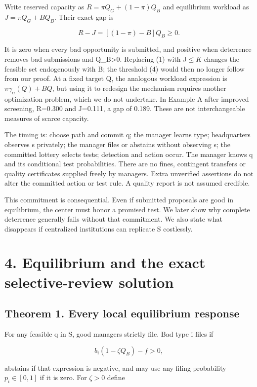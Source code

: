 \documentclass[
  11pt,
]{article}
\begin{document}
Write reserved capacity as \(R=\pi Q_G+(1-\pi)Q_B\) and equilibrium
workload as \(J=\pi Q_G+BQ_B\). Their exact gap is

\[R-J=[(1-\pi)-B]Q_B\geq0.\]

It is zero when every bad opportunity is submitted, and positive when
deterrence removes bad submissions and Q\_B\textgreater0. Replacing (1)
with J\(\leq K\) changes the feasible set endogenously with B; the
threshold (4) would then no longer follow from our proof. At a fixed
target Q, the analogous workload expression is
\(\pi\gamma_\alpha(Q)+BQ\), but using it to redesign the mechanism
requires another optimization problem, which we do not undertake. In
Example A after improved screening, R=0.300 and J=0.111, a gap of 0.189.
These are not interchangeable measures of scarce capacity.

The timing is: choose path and commit q; the manager learns type;
headquarters observes s privately; the manager files or abstains without
observing s; the committed lottery selects tests; detection and action
occur. The manager knows q and its conditional test probabilities. There
are no fines, contingent transfers or quality certificates supplied
freely by managers. Extra unverified assertions do not alter the
committed action or test rule. A quality report is not assumed credible.

This commitment is consequential. Even if submitted proposals are good
in equilibrium, the center must honor a promised test. We later show why
complete deterrence generally fails without that commitment. We also
state what disappears if centralized institutions can replicate S
costlessly.

\section{4. Equilibrium and the exact selective-review
solution}\label{equilibrium-and-the-exact-selective-review-solution}

\subsection{Theorem 1. Every local equilibrium
response}\label{theorem-1.-every-local-equilibrium-response}

For any feasible q in S, good managers strictly file. Bad type i files
if

\[b_i(1-\zeta Q_B)-f>0,\]

abstains if that expression is negative, and may use any filing
probability \(p_i\in[0,1]\) if it is zero. For \(\zeta>0\) define
\end{document}
